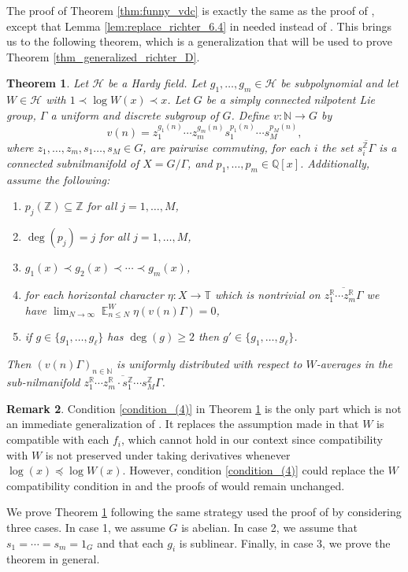 \documentclass[12pt]{article}
\theoremstyle{plain} %
\newtheorem{theorem}{Theorem}[section]
\theoremstyle{definition} %
\newtheorem{remark}[theorem]{Remark}
\theoremstyle{plain}
\theoremstyle{plain}
\numberwithin{equation}{section}
\newcommand{\N}{\mathbb{N}}
\newcommand{\Z}{\mathbb{Z}}
\newcommand{\R}{\mathbb{R}}
\newcommand{\Q}{\mathbb{Q}}
\newcommand{\T}{\mathbb{T}}
\renewcommand{\leq}{\leqslant}
\renewcommand{\geq}{\geqslant}
\renewcommand{\subset}{\subseteq}
\newcommand{\1}{\mathbbm{1}}
\newcommand{\E}{\operatorname{\mathbb{E}}}
\newcommand{\oo}{\infty}
\begin{document}
   The proof of Theorem \ref{thm:funny_vdc} is exactly the same as the proof of \cite[Proposition 6.1]{Richter23}, except that Lemma \ref{lem:replace_richter_6.4} in needed instead of \cite[Lemma 6.4]{Richter23}. This brings us to the following theorem, which is a generalization \cite[Theorem G]{Richter23} that will be used to prove Theorem \ref{thm_generalized_richter_D}.
\begin{theorem}\label{thm:generalized_G}
    Let $\mathcal{H}$ be a Hardy field. Let $g_1,\dots, g_{m}\in \mathcal{H}$ be subpolynomial and let $W\in \mathcal{H}$ with $1\prec \log W(x)\prec x$.
    Let $G$ be a simply connected nilpotent Lie group, $\Gamma$ a uniform and discrete subgroup of $G$. Define $v:\N\rightarrow G$ by 
    \begin{equation}
        v(n) = z_1^{g_1(n)}\cdots z_{m}^{g_{m}(n)}s_1^{p_1(n)}\cdots s_M^{p_M(n)},
    \end{equation}
    where $z_1,\dots, z_{m}, s_1\dots, s_M\in G$, are pairwise commuting, for each $i$ the set $\overline{s_i^{\mathbb{Z}}\Gamma}$ is a connected subnilmanifold of $X = G/\Gamma$, and $p_1,\dots, p_m\in \Q[x]$. Additionally, assume the following:
    \begin{enumerate}[label =(\arabic*)]
        \item $p_j(\Z)\subset \Z$ for all $j=1,\dots, M$,
        \item $\deg(p_j)=j$ for all $j=1,\dots, M$,
        \item $g_1(x)\prec g_2(x)\prec \cdots \prec g_{m}(x)$,
        \item \label{condition_(4)} for each horizontal character $\eta:X\rightarrow \T$ which is nontrivial on $\overline{z_1^{\R}\cdots z_{m}^{\R}\Gamma}$ we have $\lim_{N\to\oo}\E^W_{n\leq N}\eta(v(n)\Gamma)=0$,
        \item if $g\in \{g_1,\dots, g_{\ell}\}$ has $\deg(g)\geq 2$ then $g'\in \{g_1,\dots, g_{\ell}\}$.
    \end{enumerate}


    Then $(v(n)\Gamma)_{n\in \N}$ is uniformly distributed with respect to $W$-averages in the sub-nilmanifold $\overline{z_1^{\R}\cdots z_{m}^{\R}\cdot s_1^{\Z}\cdots s_M^{\Z}\Gamma}$. 
\end{theorem}

\begin{remark}
    Condition \ref{condition_(4)} in Theorem \ref{thm:generalized_G} is the only part which is not an immediate generalization of \cite[Theorem G]{Richter23}. It replaces the assumption made in \cite[Theorem G]{Richter23} that $W$ is compatible with each $f_i$, which cannot hold in our context since compatibility with $W$ is not preserved under taking derivatives whenever $\log(x)\preceq \log W(x)$. However, condition \ref{condition_(4)} could replace the $W$ compatibility condition in \cite[Theorem G]{Richter23} and the proofs of \cite{Richter23} would remain unchanged.
\end{remark}
We prove Theorem \ref{thm:generalized_G} following the same strategy used the proof of \cite[Theorem G]{Richter23} by considering three cases. In case 1, we assume $G$ is abelian. In case 2, we assume that $s_1=\cdots = s_m = 1_G$ and that each $g_i$ is sublinear. Finally, in case 3, we prove the theorem in general.
\end{document}
